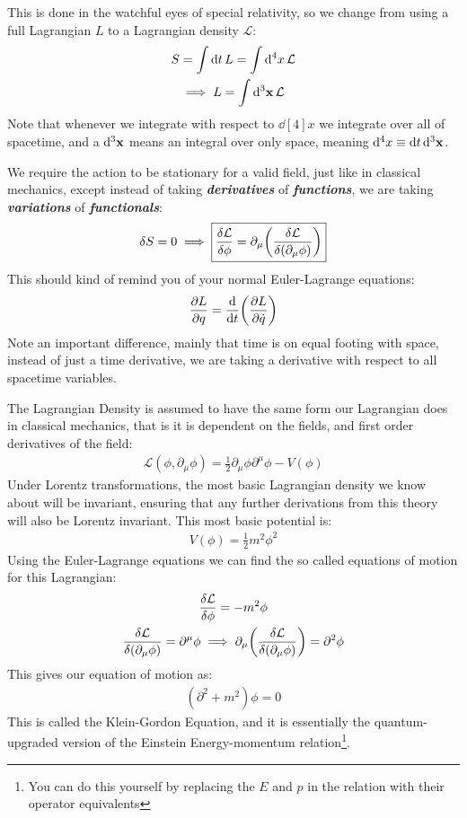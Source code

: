 \documentclass[12pt]{article}
\renewcommand{\L}{\mathcal{L}}
\newcommand{\D}{\partial}
\newcommand{\ddst}{\dd[4]{x}}
\newcommand{\dds}{\dd[3]{\vb{x}}}
\newcommand{\textbm}[1]{\textbf{\emph{#1}}}
\begin{document}
This is done in the watchful eyes of special relativity, so we change from using a full Lagrangian $L$ to a Lagrangian density $\L$:
\begin{gather*}
  S=\int\dd{t}L=\int\dd[4]{x}\L\\
  \implies L=\int\dd[3]{\vb{x}}\L
\end{gather*}
Note that whenever we integrate with respect to $\ddst$ we integrate over all of spacetime, and a $\dds$ means an integral over only space, meaning $\ddst\equiv\dd{t}\dds$.

We require the action to be stationary for a valid field, just like in classical mechanics, except instead of taking \textbm{derivatives} of \textbm{functions}, we are taking \textbm{variations} of \textbm{functionals}:
\begin{align*}
  \delta S=0\implies\boxed{\fdv{\L}{\phi}=\D_\mu\qty(\fdv{\L}{(\D_\mu\phi)})}
\end{align*}
This should kind of remind you of your normal Euler-Lagrange equations:
\begin{align*}
  \pdv{L}{q}=\dv{t}\qty(\pdv{L}{\dot{q}})
\end{align*}
Note an important difference, mainly that time is on equal footing with space, instead of just a time derivative, we are taking a derivative with respect to all spacetime variables.

The Lagrangian Density is assumed to have the same form our Lagrangian does in classical mechanics, that is it is dependent on the fields, and first order derivatives of the field:
\begin{align*}
  \boxed{\L(\phi,\D_\mu\phi)=\frac{1}{2}\D_\mu\phi\D^\mu\phi-V(\phi)}
\end{align*}
Under Lorentz transformations, the most basic Lagrangian density we know about will be invariant, ensuring that any further derivations from this theory will also be Lorentz invariant. This most basic potential is:
\begin{align*}
  V(\phi)=\frac{1}{2}m^2\phi^2
\end{align*}
Using the Euler-Lagrange equations we can find the so called equations of motion for this Lagrangian:
\begin{gather*}
  \fdv{\L}{\phi}=-m^2\phi\\
  \fdv{\L}{(\D_\mu\phi)}=\D^\mu\phi\implies
  \D_\mu\qty(\fdv{\L}{(\D_\mu\phi)})=\D^2\phi
\end{gather*}
This gives our equation of motion as:
\begin{align*}
  (\D^2+m^2)\phi=0
\end{align*}
This is called the Klein-Gordon Equation, and it is essentially the quantum-upgraded version of the Einstein Energy-momentum relation\footnote{You can do this yourself by replacing the $E$ and $p$ in the relation with their operator equivalents}.
\end{document}
